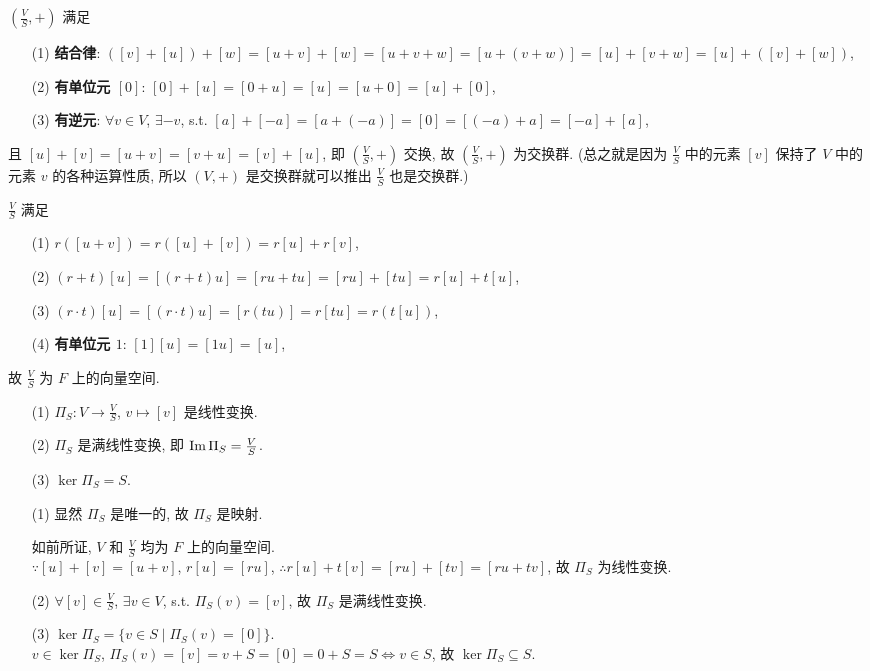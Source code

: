 \documentclass{note}
\begin{document}
\begin{pf}
    $\left(\frac{V}{S},+\right)$ 满足
    \begin{itemize}
        \item[(1)] \textbf{结合律}: $([v]+[u])+[w]=[u+v]+[w]=[u+v+w]=[u+(v+w)]=[u]+[v+w]=[u]+([v]+[w])$,
        \item[(2)] \textbf{有单位元 $[0]$}: $[0]+[u]=[0+u]=[u]=[u+0]=[u]+[0]$,
        \item[(3)] \textbf{有逆元}: $\forall v\in V$, $\exists-v$, s.t. $[a]+[-a]=[a+(-a)]=[0]=[(-a)+a]=[-a]+[a]$,
    \end{itemize}
    且 $[u]+[v]=[u+v]=[v+u]=[v]+[u]$, 即 $\left(\frac{V}{S},+\right)$ 交换, 故 $\left(\frac{V}{S},+\right)$ 为交换群. (总之就是因为 $\frac{V}{S}$ 中的元素 $[v]$ 保持了 $V$ 中的元素 $v$ 的各种运算性质, 所以 $(V,+)$ 是交换群就可以推出 $\frac{V}{S}$ 也是交换群.)

    $\frac{V}{S}$ 满足
    \begin{itemize}
        \item[(1)] $r([u+v])=r([u]+[v])=r[u]+r[v]$,
        \item[(2)] $(r+t)[u]=[(r+t)u]=[ru+tu]=[ru]+[tu]=r[u]+t[u]$,
        \item[(3)] $(r\cdot t)[u]=[(r\cdot t)u]=[r(tu)]=r[tu]=r(t[u])$,
        \item[(4)] \textbf{有单位元 $1$}: $[1][u]=[1u]=[u]$,
    \end{itemize}
    故 $\frac{V}{S}$ 为 $F$ 上的向量空间.
\end{pf}

\begin{thm}[(课本定理 3.2)]
    \begin{itemize}
        \item[(1)] $\Pi_S:V\rightarrow\frac{V}{S}$, $v\mapsto[v]$ 是线性变换.
        \item[(2)] $\Pi_S$ 是满线性变换, 即 $\operatorname{Im}\Pi_S=\frac{V}{S}$.
        \item[(3)] $\ker\Pi_S=S$.
    \end{itemize}
\end{thm}
\begin{pf}
    \begin{itemize}
        \item[(1)] 显然 $\Pi_S$ 是唯一的, 故 $\Pi_S$ 是映射.

        如前所证, $V$ 和 $\frac{V}{S}$ 均为 $F$ 上的向量空间.\\
        $\because[u]+[v]=[u+v]$, $r[u]=[ru]$, $\therefore r[u]+t[v]=[ru]+[tv]=[ru+tv]$, 故 $\Pi_S$ 为线性变换.
        \item[(2)] $\forall[v]\in\frac{V}{S}$, $\exists v\in V$, s.t. $\Pi_S(v)=[v]$, 故 $\Pi_S$ 是满线性变换.
        \item[(3)] $\ker\Pi_S=\{v\in S\mid\Pi_S(v)=[0]\}$.\\
        $v\in\ker\Pi_S$, $\Pi_S(v)=[v]=v+S=[0]=0+S=S\Longleftrightarrow v\in S$, 故 $\ker\Pi_S\subseteq S$.
    \end{itemize}
\end{pf}
\end{document}
